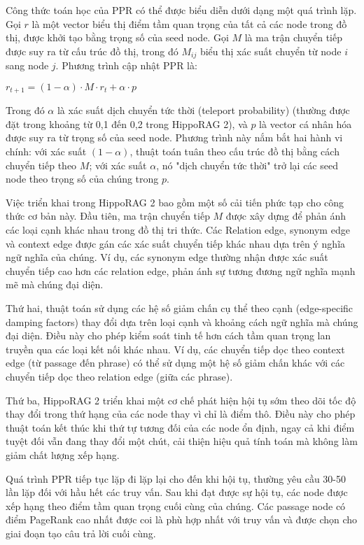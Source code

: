 \documentclass[../main.tex]{subfiles}
\begin{document}
Công thức toán học của PPR có thể được biểu diễn dưới dạng một quá trình lặp. Gọi $r$ là một vector biểu thị điểm tầm quan trọng của tất cả các node trong đồ thị, được khởi tạo bằng trọng số của seed node. Gọi $M$ là ma trận chuyển tiếp được suy ra từ cấu trúc đồ thị, trong đó $M_{ij}$ biểu thị xác suất chuyển từ node $i$ sang node $j$. Phương trình cập nhật PPR là:

$r_{t+1} = (1-\alpha) \cdot M \cdot r_t + \alpha \cdot p$

Trong đó $\alpha$ là xác suất dịch chuyển tức thời (teleport probability) (thường được đặt trong khoảng từ 0,1 đến 0,2 trong HippoRAG 2), và $p$ là vector cá nhân hóa được suy ra từ trọng số của seed node. Phương trình này nắm bắt hai hành vi chính: với xác suất $(1-\alpha)$, thuật toán tuân theo cấu trúc đồ thị bằng cách chuyển tiếp theo $M$; với xác suất $\alpha$, nó "dịch chuyển tức thời" trở lại các seed node theo trọng số của chúng trong $p$.

Việc triển khai trong HippoRAG 2 bao gồm một số cải tiến phức tạp cho công thức cơ bản này. Đầu tiên, ma trận chuyển tiếp $M$ được xây dựng để phản ánh các loại cạnh khác nhau trong đồ thị tri thức. Các Relation edge, synonym edge và context edge được gán các xác suất chuyển tiếp khác nhau dựa trên ý nghĩa ngữ nghĩa của chúng. Ví dụ, các synonym edge thường nhận được xác suất chuyển tiếp cao hơn các relation edge, phản ánh sự tương đương ngữ nghĩa mạnh mẽ mà chúng đại diện.

Thứ hai, thuật toán sử dụng các hệ số giảm chấn cụ thể theo cạnh (edge-specific damping factors) thay đổi dựa trên loại cạnh và khoảng cách ngữ nghĩa mà chúng đại diện. Điều này cho phép kiểm soát tinh tế hơn cách tầm quan trọng lan truyền qua các loại kết nối khác nhau. Ví dụ, các chuyển tiếp dọc theo context edge (từ passage đến phrase) có thể sử dụng một hệ số giảm chấn khác với các chuyển tiếp dọc theo relation edge (giữa các phrase).

Thứ ba, HippoRAG 2 triển khai một cơ chế phát hiện hội tụ sớm theo dõi tốc độ thay đổi trong thứ hạng của các node thay vì chỉ là điểm thô. Điều này cho phép thuật toán kết thúc khi thứ tự tương đối của các node ổn định, ngay cả khi điểm tuyệt đối vẫn đang thay đổi một chút, cải thiện hiệu quả tính toán mà không làm giảm chất lượng xếp hạng.

Quá trình PPR tiếp tục lặp đi lặp lại cho đến khi hội tụ, thường yêu cầu 30-50 lần lặp đối với hầu hết các truy vấn. Sau khi đạt được sự hội tụ, các node được xếp hạng theo điểm tầm quan trọng cuối cùng của chúng. Các passage node có điểm PageRank cao nhất được coi là phù hợp nhất với truy vấn và được chọn cho giai đoạn tạo câu trả lời cuối cùng.
\end{document}

